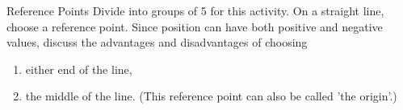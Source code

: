 \begin{groupdiscussion}{Reference Points }
            \nopagebreak
        \label{m38787*id62809}Divide into groups of 5 for this activity.
On a straight line, choose a reference point. Since position can have both positive and negative values, discuss the advantages and disadvantages of choosing\par 
        \label{m38787*id62816}\begin{enumerate}[noitemsep, label=\textbf{\arabic*}. ] 
            \label{m38787*uid9}\item either end of the line,
\label{m38787*uid10}\item the middle of the line. (This reference point can also be called 'the origin'.)
\end{enumerate}
\end{groupdiscussion}
\label{m38787*secfhsst!!!underscore!!!id138}
